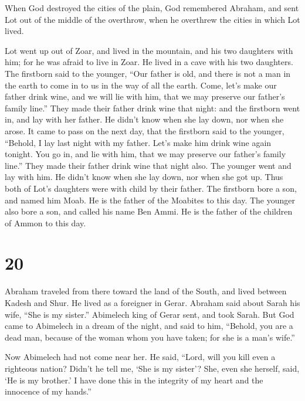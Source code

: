  When God destroyed the cities of the plain, God
remembered Abraham, and sent Lot out of the middle of the overthrow,
when he overthrew the cities in which Lot lived.

 Lot went up out of Zoar, and lived in the mountain, and
his two daughters with him; for he was afraid to live in Zoar. He lived
in a cave with his two daughters.  The firstborn said to
the younger, ``Our father is old, and there is not a man in the earth to
come in to us in the way of all the earth.  Come, let's
make our father drink wine, and we will lie with him, that we may
preserve our father's family line.''  They made their
father drink wine that night: and the firstborn went in, and lay with
her father. He didn't know when she lay down, nor when she arose.
 It came to pass on the next day, that the firstborn said
to the younger, ``Behold, I lay last night with my father. Let's make
him drink wine again tonight. You go in, and lie with him, that we may
preserve our father's family line.''  They made their
father drink wine that night also. The younger went and lay with him. He
didn't know when she lay down, nor when she got up.  Thus
both of Lot's daughters were with child by their father. 
The firstborn bore a son, and named him Moab. He is the father of the
Moabites to this day.  The younger also bore a son, and
called his name Ben Ammi. He is the father of the children of Ammon to
this day.

\hypertarget{section-19}{%
\section{20}\label{section-19}}

 Abraham traveled from there toward the land of the South,
and lived between Kadesh and Shur. He lived as a foreigner in Gerar.
 Abraham said about Sarah his wife, ``She is my sister.''
Abimelech king of Gerar sent, and took Sarah.  But God
came to Abimelech in a dream of the night, and said to him, ``Behold,
you are a dead man, because of the woman whom you have taken; for she is
a man's wife.''

 Now Abimelech had not come near her. He said, ``Lord,
will you kill even a righteous nation?  Didn't he tell me,
`She is my sister'? She, even she herself, said, `He is my brother.' I
have done this in the integrity of my heart and the innocence of my
hands.''

